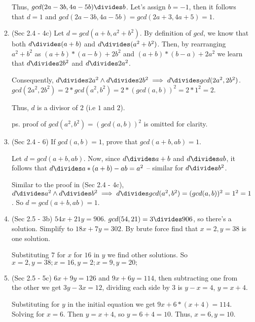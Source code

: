 \documentclass[12pt]{article}
\begin{document}
\begin{enumerate}
  Thus, $gcd(2a - 3b, 4a - 5b) \divides b$. Let's assign $b = -1$, then it follows that $d = 1$ and
  $gcd(2a - 3b, 4a - 5b) = gcd(2a + 3, 4a + 5) = 1$.

  \item
  (Sec 2.4 - 4c) Let $d = gcd(a + b, a^2 + b^2)$. By definition of $gcd$, we know that both $d \divides (a + b)$
  and $d \divides (a^2 + b^2)$. Then, by rearranging $a^2 + b^2$ as $(a + b) * (a - b) + 2b^2$ and $(a + b) * (b - a) + 2a^2$ we learn that
  $d \divides 2b^2$ and $d \divides 2a^2$.
  
  Consequently, $d \divides 2a^2 \land d \divides 2b^2 \implies d \divides gcd(2a^2, 2b^2)$.
  $gcd(2a^2, 2b^2) = 2 * gcd(a^2, b^2) = 2 * (gcd(a, b))^2 = 2 * 1 ^ 2 = 2$.

  Thus, $d$ is a divisor of $2$ (i.e $1$ and $2$).

  ps. proof of $gcd(a^2, b^2) = (gcd(a, b))^2$ is omitted for clarity.

  \item
  (Sec 2.4 - 6) If $gcd(a, b) = 1$, prove that $gcd(a + b, ab) = 1$.

  Let $d = gcd(a + b, ab)$. Now, since $d \divides a + b$ and $d \divides ab$,
  it follows that $d \divides a * (a + b) - ab = a^2$ -- similar for $d \divides b^2$.

  Similar to the proof in (Sec 2.4 - 4c), $d \divides a^2 \land d \divides b^2 \implies
  d \divides gcd(a^2, b^2) = (gcd(a, b))^2 = 1^2 = 1$. So $d = gcd(a + b, ab) = 1$.

  \item
  (Sec 2.5 - 3b) $54x + 21y = 906$. $gcd(54, 21) = 3 \divides 906$, so there's a solution.
  Simplify to $18x + 7y = 302$. By brute force find that $x = 2, y = 38$ is one solution.

  Substituting $7$ for $x$ for $16$ in $y$ we find other solutions. So $x = 2, y = 38; x = 16, y = 2; x = 9, y = 20;$

  \item
  (Sec 2.5 - 5c) $6x + 9y = 126$ and $9x + 6y = 114$, then subtracting one from the other we get
  $3y - 3x = 12$, dividing each side by $3$ is $y - x = 4$, $y = x + 4$.

  Substituting for $y$ in the initial equation we get $9x + 6*(x + 4) = 114$. Solving for $x = 6$.
  Then $y = x + 4$, so $y = 6 + 4 = 10$. Thus, $x = 6, y = 10$.
\end{enumerate}
\end{document}
